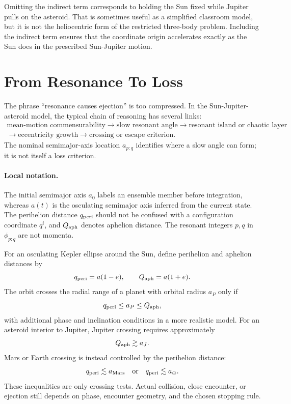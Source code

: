 \begin{remark}
Omitting the indirect term corresponds to holding the Sun fixed while Jupiter
pulls on the asteroid. That is sometimes useful as a simplified classroom
model, but it is not the heliocentric form of the restricted three-body
problem. Including the indirect term ensures that the coordinate origin
accelerates exactly as the Sun does in the prescribed Sun-Jupiter motion.
\end{remark}

\section{From Resonance To Loss}
\label{sec:from-resonance-to-loss}

The phrase ``resonance causes ejection'' is too compressed.  In the
Sun-Jupiter-asteroid model, the typical chain of reasoning has several links:
\[
  \begin{gathered}
  \text{mean-motion commensurability}
  \longrightarrow
  \text{slow resonant angle}
  \longrightarrow
  \text{resonant island or chaotic layer}\\
  \longrightarrow
  \text{eccentricity growth}
  \longrightarrow
  \text{crossing or escape criterion}.
  \end{gathered}
\]
The nominal semimajor-axis location \(a_{p:q}\) identifies where a slow angle
can form; it is not itself a loss criterion.

\paragraph{Local notation.}
The initial semimajor axis \(a_0\) labels an ensemble member before integration,
whereas \(a(t)\) is the osculating semimajor axis inferred from the current
state.  The perihelion distance \(q_{\rm peri}\) should not be confused with a
configuration coordinate \(q^i\), and \(Q_{\rm aph}\) denotes aphelion distance.
The resonant integers \(p,q\) in \(\phi_{p:q}\) are not momenta.

For an osculating Kepler ellipse around the Sun, define perihelion and aphelion
distances by
\[
  q_{\rm peri}=a(1-e),
  \qquad
  Q_{\rm aph}=a(1+e).
\]
The orbit crosses the radial range of a planet with orbital radius \(a_P\) only
if
\[
  q_{\rm peri}\le a_P\le Q_{\rm aph},
\]
with additional phase and inclination conditions in a more realistic model.
For an asteroid interior to Jupiter, Jupiter crossing requires approximately
\[
  Q_{\rm aph}\gtrsim a_J.
\]
Mars or Earth crossing is instead controlled by the perihelion distance:
\[
  q_{\rm peri}\lesssim a_{\rm Mars}
  \quad\text{or}\quad
  q_{\rm peri}\lesssim a_\oplus .
\]
These inequalities are only crossing tests.  Actual collision, close
encounter, or ejection still depends on phase, encounter geometry, and the
chosen stopping rule.

